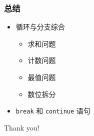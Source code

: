 \begin{frame}[fragile]
    \frametitle{总结}

    \begin{itemize}
        \item 循环与分支综合
            \begin{itemize}
                \item 求和问题
                \item 计数问题
                \item 最值问题
                \item 数位拆分
            \end{itemize}
        \item \lstinline|break| 和 \lstinline|continue| 语句
    \end{itemize}
\end{frame}

\begin{frame}
    \begin{center}
        {\Huge Thank you!}
    \end{center}
\end{frame}



